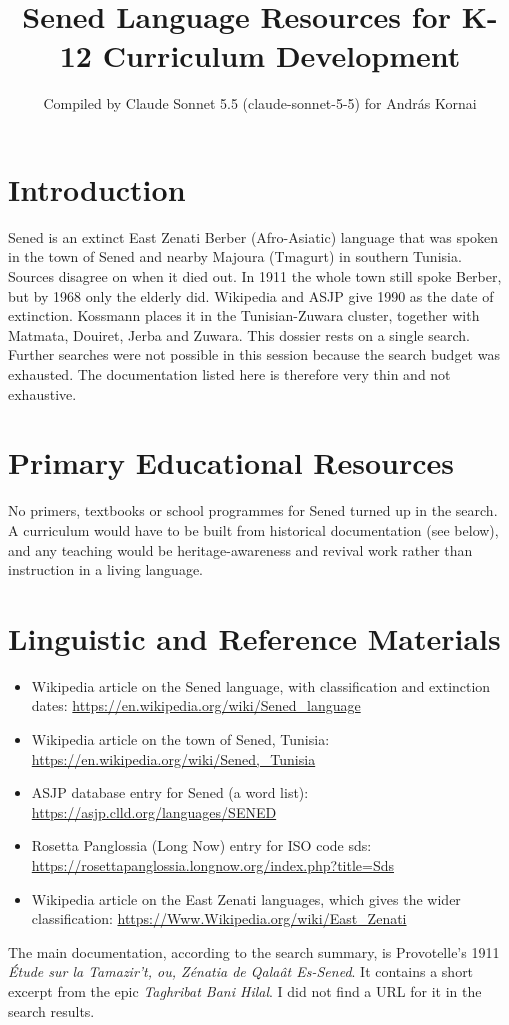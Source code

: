 \documentclass[12pt]{article}
\title{Sened Language Resources for K-12 Curriculum Development}
\author{Compiled by Claude Sonnet 5.5 (claude-sonnet-5-5) for Andr\'as Kornai}
\date{}
\begin{document}
\maketitle

\section{Introduction}
Sened is an extinct East Zenati Berber (Afro-Asiatic) language that was spoken in the town of Sened and nearby Majoura (Tmagurt) in southern Tunisia. Sources disagree on when it died out. In 1911 the whole town still spoke Berber, but by 1968 only the elderly did. Wikipedia and ASJP give 1990 as the date of extinction. Kossmann places it in the Tunisian-Zuwara cluster, together with Matmata, Douiret, Jerba and Zuwara. This dossier rests on a single search. Further searches were not possible in this session because the search budget was exhausted. The documentation listed here is therefore very thin and not exhaustive.

\section{Primary Educational Resources}
No primers, textbooks or school programmes for Sened turned up in the search. A curriculum would have to be built from historical documentation (see below), and any teaching would be heritage-awareness and revival work rather than instruction in a living language.

\section{Linguistic and Reference Materials}
\begin{itemize}
\item Wikipedia article on the Sened language, with classification and extinction dates: \url{https://en.wikipedia.org/wiki/Sened_language}
\item Wikipedia article on the town of Sened, Tunisia: \url{https://en.wikipedia.org/wiki/Sened,_Tunisia}
\item ASJP database entry for Sened (a word list): \url{https://asjp.clld.org/languages/SENED}
\item Rosetta Panglossia (Long Now) entry for ISO code sds: \url{https://rosettapanglossia.longnow.org/index.php?title=Sds}
\item Wikipedia article on the East Zenati languages, which gives the wider classification: \url{https://Www.Wikipedia.org/wiki/East_Zenati}
\end{itemize}
The main documentation, according to the search summary, is Provotelle's 1911 \emph{\'Etude sur la Tamazir't, ou, Z\'enatia de Qala\^at Es-Sened}. It contains a short excerpt from the epic \emph{Taghribat Bani Hilal}. I did not find a URL for it in the search results.
\end{document}
